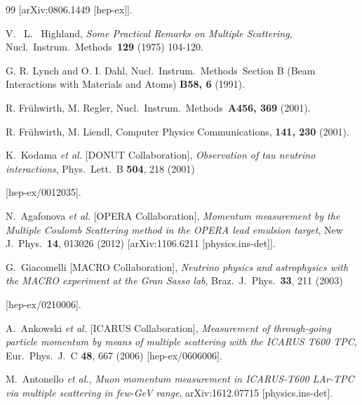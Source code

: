\documentclass[a4paper,11pt]{article}
\begin{document}
\begin{thebibliography}{99}
  [arXiv:0806.1449 [hep-ex]].




  V. ~L. ~Highland, 
  \textit{Some Practical Remarks on Multiple Scattering},
  Nucl.\ Instrum.\ Methods\ {\bf 129} (1975)
  104-120.
 
  G. R. Lynch and O. I. Dahl, Nucl.\ Instrum.\ Methods\, 
  Section B (Beam Interactions with Materials and Atoms) {\bf B58, 6} (1991). 

  R. Fr{\"u}hwirth, M. Regler, Nucl.\ Instrum.\ Methods\, {\bf A456, 369} (2001).

  R. Fr{\"u}hwirth, M. Liendl, Computer Physics Communications, {\bf 141, 230} (2001).

  K.~Kodama {\it et al.} [DONUT Collaboration],
  \textit{Observation of tau neutrino interactions},
  Phys.\ Lett.\ B {\bf 504}, 218 (2001)

  [hep-ex/0012035].

  N.~Agafonova {\it et al.} [OPERA Collaboration],
  \textit{Momentum measurement by the Multiple Coulomb Scattering method in the OPERA lead emulsion target},
  New J.\ Phys.\  {\bf 14}, 013026 (2012)
  [arXiv:1106.6211 [physics.ins-det]].

 
  G.~Giacomelli [MACRO Collaboration],
  \textit{Neutrino physics and astrophysics with the MACRO experiment at the Gran Sasso lab},
  Braz.\ J.\ Phys.\  {\bf 33}, 211 (2003)

  [hep-ex/0210006].

  A.~Ankowski {\it et al.} [ICARUS Collaboration],
  \textit{Measurement of through-going particle momentum by means of multiple scattering with the ICARUS T600 TPC},
  Eur.\ Phys.\ J.\ C {\bf 48}, 667 (2006)
  [hep-ex/0606006].


  M.~Antonello {\it et al.},
  \textit{Muon momentum measurement in ICARUS-T600 LAr-TPC via multiple scattering in few-GeV range},
  arXiv:1612.07715 [physics.ins-det].



\end{thebibliography}
\end{document}
